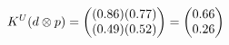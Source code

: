 \documentclass[preview]{standalone}
\begin{document}
\begin{align*}
\special{dvisvgm:raw <g id='unique000'>}K^U(d \otimes p) = \begin{pmatrix} (0.86)(0.77) \\ (0.49)(0.52) \end{pmatrix} = \begin{pmatrix} 0.66 \\ 0.26 \end{pmatrix}\special{dvisvgm:raw </g>}
\end{align*}
\end{document}
